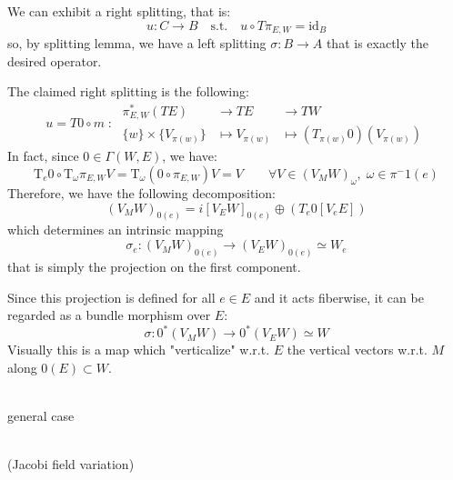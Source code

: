 \documentclass[a4paper,12pt,fleqn]{scrartcl}  %
\begin{document}
%
We can exhibit a right splitting, that is:
\begin{displaymath}
	u : C \rightarrow B \quad \textrm{s.t.} \quad u \circ T \pi_{E,W} = \textrm{id}_B
\end{displaymath}
so, by splitting lemma, we have a left splitting $\sigma : B \rightarrow A$ that is exactly the desired operator.

The claimed right splitting is the following:
	\begin{displaymath}
		u = T0 \circ m \; : \; 
		\begin{array}{ccc}
			\pi^\ast_{E,W} \left(TE \right) &\rightarrow TE &\rightarrow TW \\
			\{w\} \times \{V_{\pi(w)} \} &\mapsto V_{\pi(w)} &\mapsto \left( T_{\pi(w)}0\right) (V_{\pi(w)})		
		\end{array}
	\end{displaymath}
%
In fact, since $0 \in \Gamma (W,E)$, we have:
\begin{displaymath}
	\textrm{T}_e 0 \circ \textrm{T}_\omega \pi_{E,W} V =
	\textrm{T}_\omega \left( 0 \circ \pi_{E,W} \right) V = 
	V \qquad \forall V \in \left( V_M W \right)_\omega ,\; \omega \in \pi^-1(e)
\end{displaymath}
Therefore, we have the following decomposition:
%
\begin{displaymath}
	\left( V_M W \right)_{0(e)} = 
	i\left[ V_E W \right]_{0(e)} \oplus \left( T_e 0 \left[ V_e E\right] \right)
\end{displaymath}
which determines an intrinsic mapping 
\begin{displaymath}
	\sigma_e : \left( V_M W \right)_{0(e)} \rightarrow \left( V_E W \right)_{0(e)} \simeq W_e
\end{displaymath}
that is simply the projection on the first component.

Since this projection is defined for all $e \in E$ and it acts fiberwise, it can be regarded as a bundle morphism over $E$:
\begin{displaymath}
	\sigma : 0^\ast \left( V_M W \right) \rightarrow 0^\ast \left( V_E W \right) \simeq W
\end{displaymath} 
Visually this is a map which "verticalize" w.r.t. $E$ the vertical vectors w.r.t. $M$ along $0(E) \subset W$.
%

\begin{minipage}{.5\textwidth}
  \centering
	
 \\ \small{general case}
\end{minipage}
\begin{minipage}{.5\textwidth}
  \centering
	
 \\ \small{ (Jacobi field variation)}
\end{minipage}%
\end{document}
